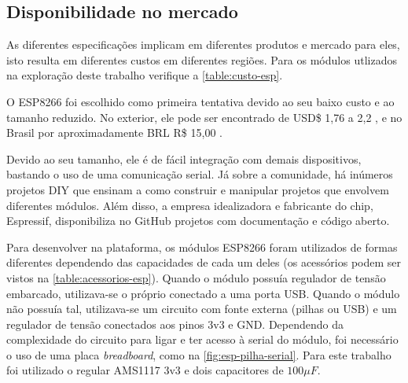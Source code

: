 \FloatBarrier
\subsection{Disponibilidade no mercado}
\label{subsec:mercado-esp}

As diferentes especificações implicam em diferentes produtos e mercado para
eles, isto resulta em diferentes custos em diferentes regiões. Para os módulos
utlizados na exploração deste trabalho verifique a \autoref{table:custo-esp}.

O ESP8266 foi escolhido como primeira tentativa devido ao seu baixo custo e ao
tamanho reduzido. No exterior, ele pode ser encontrado de USD\$ 1,76 a 2,2
\cite{AlibabaESP}, e no Brasil por aproximadamente BRL R\$ 15,00 \cite{mercadolivreEsp}.

\begin{table}[htb]
\end{table}

Devido ao seu tamanho, ele é de fácil integração com demais dispositivos,
bastando o uso de uma comunicação serial. Já sobre a comunidade, há inúmeros
projetos DIY que ensinam a como construir e manipular projetos que envolvem diferentes
módulos. Além disso, a empresa  idealizadora e fabricante do chip, Espressif,
disponibiliza no GitHub projetos com documentação e código aberto.

Para desenvolver na plataforma, os módulos ESP8266 foram utilizados de formas
diferentes dependendo das capacidades de cada um deles (os acessórios podem ser
vistos na \autoref{table:acessorios-esp}). Quando o módulo possuía regulador de
tensão embarcado, utilizava-se o próprio conectado a uma porta USB. Quando o
módulo não possuía tal, utilizava-se um circuito com fonte externa (pilhas ou
USB) e um regulador de tensão conectados aos pinos 3v3 e GND. Dependendo da
complexidade do circuito para ligar e ter acesso à serial do módulo, foi
necessário o uso de uma placa \emph{breadboard}, como na
\autoref{fig:esp-pilha-serial}. Para este trabalho foi utilizado o regular
AMS1117 3v3 e dois capacitores de $100 \mu F$.

